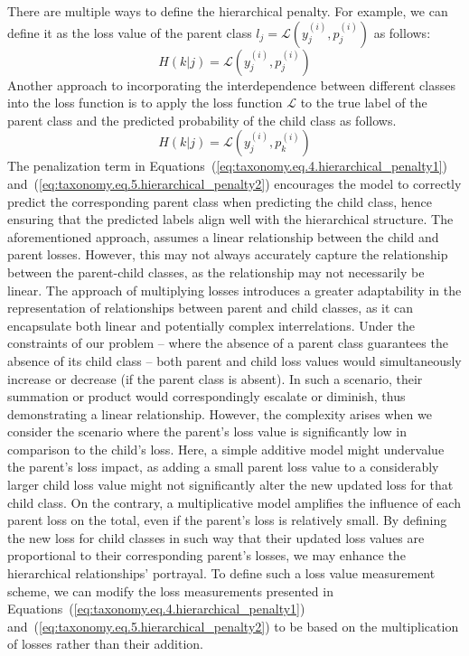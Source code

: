 There are multiple ways to define the hierarchical penalty. For example, we can define it as the loss value of the parent class $l_j=\mathcal{L} \left(y_j^{(i)},p_j^{(i)}\right) $ as follows:
\begin{equation}
    H(k \vert j)=\mathcal{L} \left(y_j^{(i)},p_j^{(i)}\right)
    \label{eq:taxonomy.eq.4.hierarchical_penalty1}
\end{equation}
Another approach to incorporating the interdependence between different classes into the loss function is to apply the loss function $\mathcal{L} $ to the true label of the parent class and the predicted probability of the child class as follows.
\begin{equation}
    H(k\vert j)  = \mathcal{L} \left(y_j^{(i)},p_k^{(i)}\right)
    \label{eq:taxonomy.eq.5.hierarchical_penalty2}
\end{equation}
The penalization term in Equations~(\ref{eq:taxonomy.eq.4.hierarchical_penalty1}) and~(\ref{eq:taxonomy.eq.5.hierarchical_penalty2}) encourages the model to correctly predict the corresponding parent class when predicting the child class, hence ensuring that the predicted labels  align well with the hierarchical structure. The aforementioned approach, assumes a linear relationship  between the child and parent losses. However, this may not always accurately capture the relationship between the parent-child classes, as the relationship may not necessarily be linear.
The approach of multiplying losses introduces a greater adaptability in the representation of relationships between parent and child classes, as it can encapsulate both linear and potentially complex interrelations. Under the constraints of our problem -- where the absence of a parent class guarantees the absence of its child class -- both parent and child loss values would simultaneously increase or decrease (if the parent class is absent). In such a scenario, their summation or product would correspondingly escalate or diminish, thus demonstrating a linear relationship.
However, the complexity arises when we consider the scenario where the parent's loss value is significantly low in comparison to the child's loss. Here, a simple additive model might undervalue the parent's loss impact, as adding a small parent loss value to a considerably larger child loss value might not significantly alter the new updated loss for that child class. On the contrary, a multiplicative model amplifies the influence of each parent loss on the total, even if the parent's loss is relatively small. By defining the new loss for child classes in such way that their updated loss values are proportional to their corresponding parent's losses, we may enhance the hierarchical relationships' portrayal. To define such a loss value measurement scheme, we can modify the loss measurements presented in Equations~(\ref{eq:taxonomy.eq.4.hierarchical_penalty1}) and~(\ref{eq:taxonomy.eq.5.hierarchical_penalty2}) to be based on the multiplication of losses rather than their addition.
